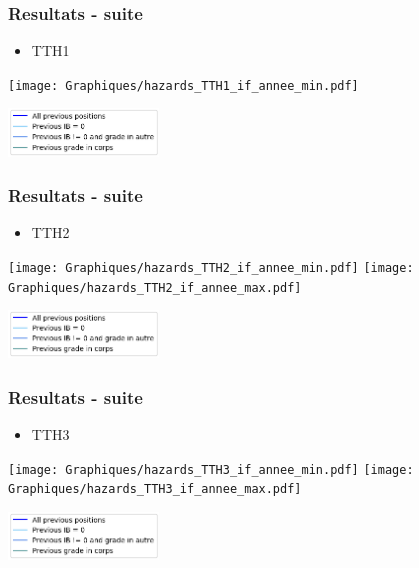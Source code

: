 \documentclass[xcolor=table,ignorenonframetext,12pt]{beamer}
\begin{document}
\begin{frame}
\frametitle{Resultats - suite}
\begin{itemize}
	\item TTH1
\end{itemize}
\begin{center}
		\texttt{[image: Graphiques/hazards\_TTH1\_if\_annee\_min.pdf]}
\end{center}
\begin{center}
		\includegraphics[width=0.3\textwidth]{Graphiques/legend.png}
\end{center}
\end{frame}

\begin{frame}
\frametitle{Resultats - suite}
\begin{itemize}
	\item TTH2
\end{itemize}
	\begin{center}
	\texttt{[image: Graphiques/hazards\_TTH2\_if\_annee\_min.pdf]}
	\texttt{[image: Graphiques/hazards\_TTH2\_if\_annee\_max.pdf]}
\end{center}
\begin{center}
	\includegraphics[width=0.3\textwidth]{Graphiques/legend.png}
\end{center}

\end{frame}


\begin{frame}
\frametitle{Resultats - suite}
\begin{itemize}
	\item TTH3
\end{itemize}
\begin{center}
	\texttt{[image: Graphiques/hazards\_TTH3\_if\_annee\_min.pdf]}
	\texttt{[image: Graphiques/hazards\_TTH3\_if\_annee\_max.pdf]}
\end{center}
\begin{center}
	\includegraphics[width=0.3\textwidth]{Graphiques/legend.png}
\end{center}

\end{frame}
\end{document}
